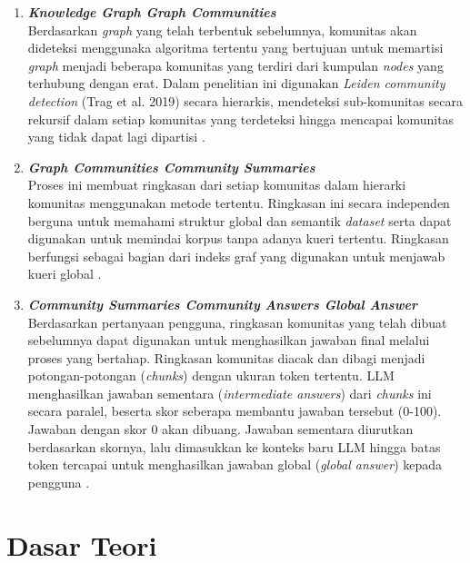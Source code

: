 \begin{enumerate}
	\item \textbf{\textit{Knowledge Graph \textrightarrow{} Graph Communities}} \\
	      Berdasarkan \textit{graph} yang telah terbentuk sebelumnya, komunitas akan dideteksi menggunaka algoritma tertentu yang bertujuan untuk memartisi \textit{graph} menjadi beberapa komunitas yang terdiri dari kumpulan \textit{nodes} yang terhubung dengan erat.
	      Dalam penelitian ini digunakan \textit{Leiden community detection} (Trag et al. 2019) secara hierarkis, mendeteksi sub-komunitas secara rekursif dalam setiap komunitas yang terdeteksi hingga mencapai komunitas yang tidak dapat lagi dipartisi \cite{Traag2019Leiden}.

	\item \textbf{\textit{Graph Communities \textrightarrow{} Community Summaries}} \\
	      Proses ini membuat ringkasan dari setiap komunitas dalam hierarki komunitas menggunakan metode tertentu.
	      Ringkasan ini secara independen berguna untuk memahami struktur global dan semantik \textit{dataset} serta dapat digunakan untuk memindai korpus tanpa adanya kueri tertentu.
	      Ringkasan berfungsi sebagai bagian dari indeks graf yang digunakan untuk menjawab kueri global \cite{Edge2025LocalGlobalGraphRAG}.

	\item \textbf{\textit{Community Summaries \textrightarrow{} Community Answers \textrightarrow{} Global Answer}} \\
	      Berdasarkan pertanyaan pengguna, ringkasan komunitas yang telah dibuat sebelumnya dapat digunakan untuk menghasilkan jawaban final melalui proses yang bertahap.
	      Ringkasan komunitas diacak dan dibagi menjadi potongan-potongan (\textit{chunks}) dengan ukuran token tertentu.
	      LLM menghasilkan jawaban sementara (\textit{intermediate answers}) dari \textit{chunks} ini secara paralel, beserta skor seberapa membantu jawaban tersebut (0-100).
	      Jawaban dengan skor 0 akan dibuang.
	      Jawaban sementara diurutkan berdasarkan skornya, lalu dimasukkan ke konteks baru LLM hingga batas token tercapai untuk menghasilkan jawaban global (\textit{global answer}) kepada pengguna \cite{Edge2025LocalGlobalGraphRAG}.
\end{enumerate}






\section{Dasar Teori}
